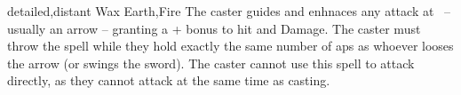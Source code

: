   {detailed,distant}%
  {Wax}%
  {Earth,Fire}%
  {}%
  {The caster guides and enhnaces any attack at \spellRange\ -- usually an arrow -- granting a + bonus to hit and Damage.
    The caster must throw the spell while they hold exactly the same number of \glspl{ap} as whoever looses the arrow (or swings the sword).}%
  {The caster cannot use this spell to attack directly, as they cannot attack at the same time as casting.}
